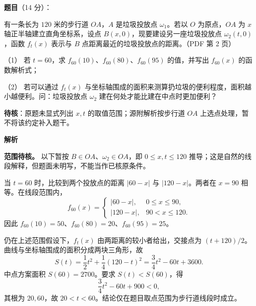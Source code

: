 \begin{answer}

\textbf{题目}（14 分）：

有一条长为 $120$ 米的步行道 $OA$，$A$ 是垃圾投放点 $\omega_1$。若以 $O$ 为原点，$OA$ 为 $x$ 轴正半轴建立直角坐标系，设点 $B(x,0)$，现要建设另一座垃圾投放点 $\omega_2(t,0)$，函数 $f_t(x)$ 表示与 $B$ 点距离最近的垃圾投放点的距离。（PDF 第 2 页）

（1） 若 $t=60$，求 $f_{60}(10)$、$f_{60}(80)$、$f_{60}(95)$ 的值，并写出 $f_{60}(x)$ 的函数解析式；

（2） 若可以通过 $f_t(x)$ 与坐标轴围成的面积来测算扔垃圾的便利程度，面积越小越便利。问：垃圾投放点 $\omega_2$ 建在何处才能比建在中点时更加便利？

\begin{gktip}
\textbf{待核}：原题未显式列出 $x,t$ 的取值范围；源附解析按步行道 $OA$ 上选点处理，暂不将该约定补入题干。
\end{gktip}

\textbf{解析}

\begin{gktip}
\textbf{范围待核。} 以下暂按 $B\in OA$、$\omega_2\in OA$，即 $0\le x,t\le120$ 推导；这是自然的线段解释，但题面未明写，不能当作已核原条件。
\end{gktip}


当 $t=60$ 时，比较到两个投放点的距离 $|60-x|$ 与 $|120-x|$。两者在 $x=90$ 相等。在线段范围内，
\nopagebreak[4]
\[
f_{60}(x)=
\begin{cases}
|60-x|,&0\le x\le90,\\
|120-x|,&90<x\le120.
\end{cases}
\]
因此 $f_{60}(10)=50$、$f_{60}(80)=20$、$f_{60}(95)=25$。


仍在上述范围假设下，$f_t(x)$ 由两距离的较小者给出，交接点为 $(t+120)/2$。曲线与坐标轴围成的面积分成两块三角形，故
\nopagebreak[4]
\[
S(t)=\frac12t^2+\frac14(120-t)^2
=\frac34t^2-60t+3600.
\]
中点方案面积 $S(60)=2700$。要求 $S(t)<S(60)$，得
\nopagebreak[4]
\[
\frac34t^2-60t+900<0,
\]
其根为 $20,60$，故 $20<t<60$。结论仅在题目取点范围为步行道线段时成立。



\end{answer}
